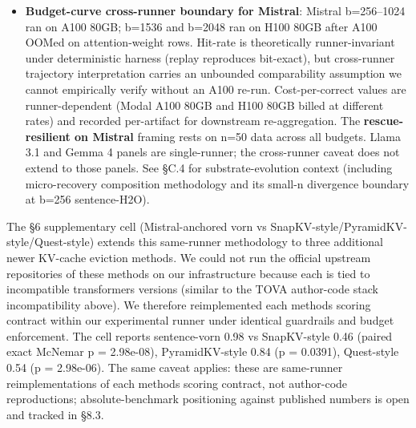 \documentclass[
]{article}
\begin{document}
\begin{itemize}
  TOVA reached 50/50 versus our same-runner \texttt{tova\_1024\_guarded}
  at 43/50 (paired exact McNemar p = 0.0156, one-directional 7-cell
  gap), with the caveat that the comparator includes guardrail +
  recent-window scaffolding that the author-code does not. Our
  implementation is faithful-direction-but-slightly-conservative on the
  one family where author-code permits comparison.
  Family-dependent implementation-faithfulness on Gemma 4, Llama 3.1,
  Qwen 2.5, and Qwen 3-NT is untested and is a partial-explanation
  hypothesis we cannot rule out. Section 5 should therefore be read as
  "vorn versus our same-runner attention-weight controls." Cross-family
  author-code verification is in §8.3.
\item
  \textbf{Budget-curve cross-runner boundary for Mistral}: Mistral
  b=256--1024 ran on A100 80GB; b=1536 and b=2048 ran on H100 80GB after
  A100 OOMed on attention-weight rows. Hit-rate is theoretically
  runner-invariant under deterministic harness (replay reproduces
  bit-exact), but cross-runner trajectory interpretation carries an
  unbounded comparability assumption we cannot empirically verify
  without an A100 re-run. Cost-per-correct values are runner-dependent
  (Modal A100 80GB and H100 80GB billed at different rates) and recorded
  per-artifact for downstream re-aggregation. The
  \textbf{rescue-resilient on Mistral} framing rests on n=50 data
  across all budgets. Llama 3.1 and Gemma 4 panels are single-runner;
  the cross-runner caveat does not extend to those panels. See §C.4
  for substrate-evolution context (including micro-recovery
  composition methodology and its small-n divergence boundary at
  b=256 sentence-H2O).
\end{itemize}

The §6 supplementary cell (Mistral-anchored vorn vs
SnapKV-style/PyramidKV-style/Quest-style) extends this same-runner
methodology to three additional newer KV-cache eviction methods. We
could not run the official upstream repositories of these methods on our
infrastructure because each is tied to incompatible transformers
versions (similar to the TOVA author-code stack incompatibility above).
We therefore reimplemented each method\textquotesingle s scoring
contract within our experimental runner under identical guardrails and
budget enforcement. The cell reports sentence-vorn 0.98 vs SnapKV-style
0.46 (paired exact McNemar p = 2.98e-08), PyramidKV-style 0.84 (p =
0.0391), Quest-style 0.54 (p = 2.98e-06). The same caveat applies:
these are same-runner reimplementations of each method\textquotesingle s
scoring contract, not author-code reproductions; absolute-benchmark
positioning against published numbers is open and tracked in §8.3.
\end{document}
